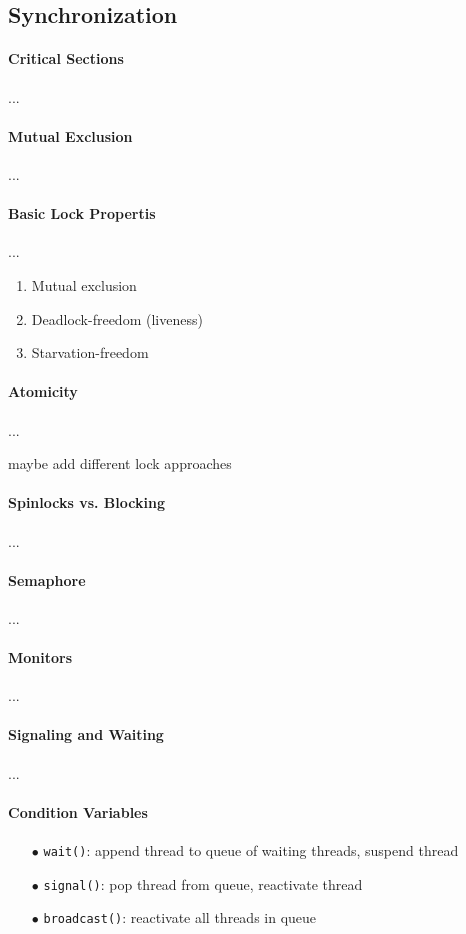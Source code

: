\documentclass[8pt]{extarticle}
\begin{document}
\begin{multicols*}{4}
\section{Synchronization}

\paragraph{Critical Sections}...

\paragraph{Mutual Exclusion}...

\paragraph{Basic Lock Propertis}...
  \begin{enumerate}
    \item Mutual exclusion
    \item Deadlock-freedom (liveness)
    \item Starvation-freedom
  \end{enumerate}

\paragraph{Atomicity}...

maybe add different lock approaches

\paragraph{Spinlocks vs. Blocking}...

\paragraph{Semaphore}...

\paragraph{Monitors}...

\paragraph{Signaling and Waiting}...

\paragraph{Condition Variables}
\begin{enumerate}
  \item[$\bullet$] \texttt{wait()}: append thread to queue of waiting threads, suspend thread
  \item[$\bullet$] \texttt{signal()}: pop thread from queue, reactivate thread
  \item[$\bullet$] \texttt{broadcast()}: reactivate all threads in queue
\end{enumerate}   


\end{multicols*}
\end{document}
